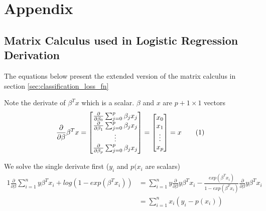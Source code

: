 \documentclass[../statistical_learning_notes.tex]{subfiles}
\begin{document}
\chapter{Appendix}


\section{Matrix Calculus used in Logistic Regression Derivation}\label{sec:appendix_classification_loss_fn}
The equations below present the extended version of the matrix calculus in section \ref{sec:classification_loss_fn}\newline

Note the derivate of $\beta^{T}x$ which is a scalar. $\beta$ and $x$ are $p+1 \times 1$ vectors
\begin{gather*}
    \frac{\partial}{\partial \beta}\beta^{T}x =     
    \begin{bmatrix}
        \frac{\partial}{\partial \beta_{0}} \sum_{j=0}^{p} \beta_{j}x_{j}\\
        \frac{\partial}{\partial \beta_{1}} \sum_{j=0}^{p} \beta_{j}x_{j}\\
        \vdots\\
        \frac{\partial}{\partial \beta_{p}} \sum_{j=0}^{p} \beta_{j}x_{j}
    \end{bmatrix}
    = 
    \begin{bmatrix}
        x_{0}\\
        x_{1}\\
        \vdots\\
        x_{p}
    \end{bmatrix}
    = x \numberthiseqn\label{eq:betax_derivative}
\end{gather*}

We solve the single derivate first ($y_{i}$ and $p(x_{i}$ are scalars)
\begin{alignat*}{1}
    \frac{\partial}{\partial \beta}\sum_{i=1}^{n} y\beta^{T}x_{i} + log(1 - exp(\beta^{T}x_{i})) &= \sum_{i=1}^{n} y \frac{\partial}{\partial \beta} y\beta^{T}x_{i} - \frac{exp(\beta^{T}x_{i})}{1 - exp(\beta^{T}x_{i})} \frac{\partial}{\partial \beta} y\beta^{T}x_{i}\\
    &= \sum_{i=1}^{n} x_{i}(y_{i} - p(x_{i}))
\end{alignat*}
\end{document}
